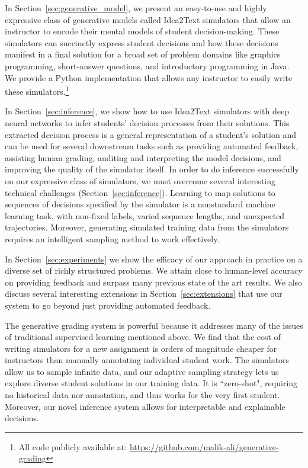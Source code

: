 In Section~\ref{sec:generative_model}, we present an easy-to-use and highly expressive class of generative models called Idea2Text simulators that allow an instructor to encode their mental models of student decision-making. These simulators can succinctly express student decisions and how these decisions manifest in a final solution for a broad set of problem domains like graphics programming, short-answer questions, and introductory programming in Java. We provide a Python implementation that allows any instructor to easily write these simulators.\footnote{All code publicly available at: \url{https://github.com/malik-ali/generative-grading}}
    
In Section~\ref{sec:inference}, we show how to use Idea2Text simulators with deep neural networks to infer students' decision processes from their solutions. This extracted decision process is a general representation of a student's solution and can be used for several downstream tasks such as providing automated feedback, assisting human grading, auditing and interpreting the model decisions, and improving the quality of the simulator itself. 
In order to do inference successfully on our expressive class of simulators, we must overcome several interesting technical challenges (Section~\ref{sec:inference}). Learning to map solutions to sequences of decisions specified by the simulator is a nonstandard machine learning task, with non-fixed labels, varied sequence lengths, and unexpected trajectories. Moreover, generating simulated training data from the simulators requires an intelligent sampling method to work effectively. 

In Section~\ref{sec:experiments} we show the efficacy of our approach in practice on a diverse set of richly structured problems. We attain close to human-level accuracy on providing feedback and surpass many previous state of the art results. We also discuss several interesting extensions in Section~\ref{sec:extensions} that use our system to go beyond just providing automated feedback. 

The generative grading system is powerful because it addresses many of the issues of traditional supervised learning mentioned above. We find that the cost of writing simulators for a new assignment is orders of magnitude cheaper for instructors than manually annotating individual student work. The simulators allow us to sample infinite data, and our adaptive sampling strategy lets us explore diverse student solutions in our training data. It is ``zero-shot", requiring no historical data nor annotation, and thus works for the very first student.  Moreover, our novel inference system allows for interpretable and explainable decisions.

